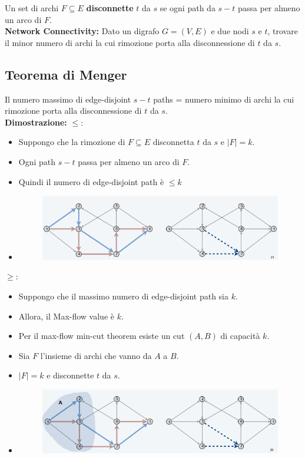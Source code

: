 Un set di archi $F \subseteq E$ \textbf{disconnette} $t$ da $s$ se
ogni path da $s-t$ passa per almeno un arco di $F$.\\

\textbf{Network Connectivity:} Dato un digrafo $G = (V,E)$ e due nodi
$s$ e $t$, trovare il minor numero di archi la cui rimozione porta
alla disconnessione di $t$ da $s$.\\

\subsection{Teorema di Menger}

Il numero massimo di edge-disjoint $s-t$ paths = numero minimo di
archi la cui rimozione porta alla disconnessione di $t$ da $s$.\\

\textbf{Dimostrazione:} $\le:$
\begin{itemize}
    \item Suppongo che la rimozione di $F \subseteq E$ disconnetta $t$ da $s$ e $|F| = k$.
    \item Ogni path $s-t$ passa per almeno un arco di $F$.
    \item Quindi il numero di edge-disjoint path è $\le k$
    \item \begin{figure}[H]
        \centering
        \includegraphics[width = 12cm]{Network_flow/imgs/bipartite4.png}
        \end{figure}
\end{itemize}

$\ge :$
\begin{itemize}
    \item Suppongo che il massimo numero di edge-disjoint path sia $k$.
    \item Allora, il Max-flow value è $k$.
    \item Per il max-flow min-cut theorem esiste un cut $(A,B)$ di capacità $k$.
    \item Sia $F$ l'insieme di archi che vanno da $A$ a $B$.
    \item $|F| = k$ e disconnette $t$ da $s$.
    \item  \begin{figure}[H]
        \centering
        \includegraphics[width = 12cm]{Network_flow/imgs/bipartite5.png}
        \end{figure}
\end{itemize}

%
